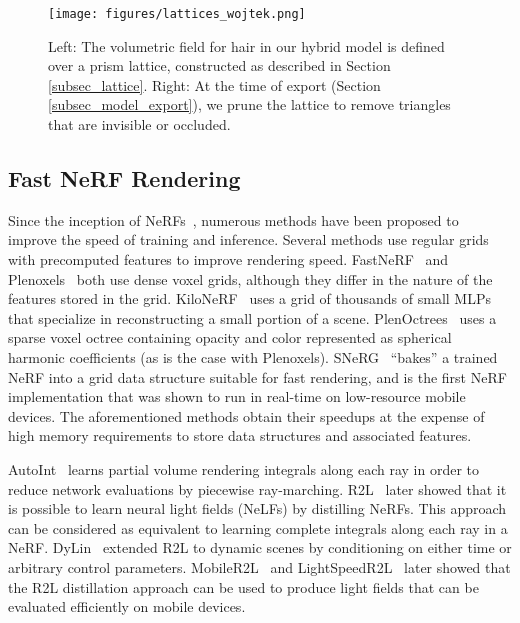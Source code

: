 \begin{figure*}[h!]
    \texttt{[image: figures/lattices\_wojtek.png]}
    \caption{Left: The volumetric field for hair in our hybrid model is defined over a prism lattice, constructed as described in Section \ref{subsec_lattice}. Right: At the time of export (Section \ref{subsec_model_export}), we prune the lattice to remove triangles that are invisible or occluded.}
    \label{fig_lattices}
\end{figure*}

\subsection{Fast NeRF Rendering}

Since the inception of NeRFs~\cite{mildenhall2021nerf}, numerous methods have been proposed to improve the speed of training and inference. 
Several methods use regular grids with precomputed features to improve rendering speed. FastNeRF~\cite{garbin2021fastnerf} and Plenoxels~\cite{fridovich2022plenoxels} both use dense voxel grids, although they differ in the nature of the features stored in the grid. KiloNeRF~\cite{reiser2021kilonerf} uses a grid of thousands of small MLPs that specialize in reconstructing a small portion of a scene. PlenOctrees~\cite{yu2021plenoctrees} uses a sparse voxel octree containing opacity and color represented as spherical harmonic coefficients (as is the case with Plenoxels).
SNeRG~\cite{hedman2021snerg} ``bakes'' a trained NeRF into a grid data structure suitable for fast rendering, and is the first NeRF implementation that was shown to run in real-time on low-resource mobile devices.
The aforementioned methods obtain their speedups at the expense of high memory requirements to store data structures and associated features.

AutoInt~\cite{lindell2021autoint} learns partial volume rendering integrals along each ray in order to reduce network evaluations by piecewise ray-marching. R2L~\cite{wang2022r2l} later showed that it is possible to learn neural light fields (NeLFs) by distilling NeRFs. This approach can be considered as equivalent to learning complete integrals along each ray in a NeRF. DyLin~\cite{yu2023dylin} extended R2L to dynamic scenes by conditioning on either time or arbitrary control parameters. MobileR2L~\cite{cao2023mobiler2l} and LightSpeedR2L~\cite{gupta2023lightspeed} later showed that the R2L distillation approach can be used to produce light fields that can be evaluated efficiently on mobile devices. 


